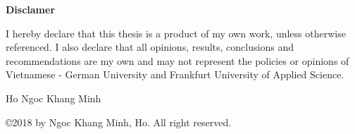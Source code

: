   {
  	\begin{center}
  		\Large
  		\bf Disclamer
  	\end{center}
  	{
  		\par
  		I hereby declare that this thesis is a product of my own work, unless otherwise
  		referenced. I also declare that all opinions, results, conclusions and recommendations are
  		my own and may not represent the policies or opinions of Vietnamese - German University and Frankfurt University of Applied Science. \par
  	}
  	\vspace{3cm}
  	\hspace{11cm}
  	Ho Ngoc Khang Minh
  	\cleardoublepage
  }	

\cleardoublepage

\pagestyle{plain}
\setcounter{page}{3}

\cleardoublepage %

\begin{center}
\vspace*{\fill}
\copyright 2018 by Ngoc Khang Minh, Ho. All right reserved.
\vspace*{\fill}
\end{center}



\cleardoublepage

